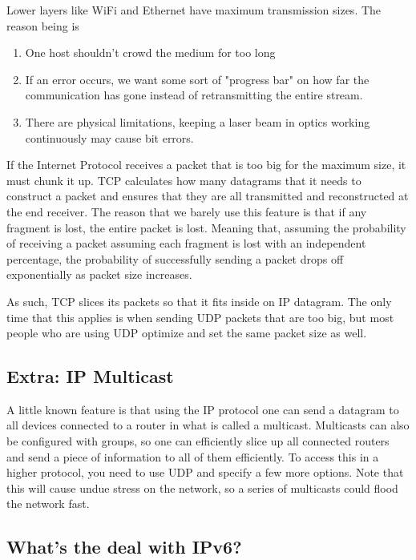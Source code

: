 Lower layers like WiFi and Ethernet have maximum transmission sizes.
The reason being is

\begin{enumerate}
  \item One host shouldn't crowd the medium for too long
  \item If an error occurs, we want some sort of "progress bar" on how far the communication has gone instead of retransmitting the entire stream.
  \item There are physical limitations, keeping a laser beam in optics working continuously may cause bit errors.
\end{enumerate}

If the Internet Protocol receives a packet that is too big for the maximum size, it must chunk it up.
TCP calculates how many datagrams that it needs to construct a packet and ensures that they are all transmitted and reconstructed at the end receiver.
The reason that we barely use this feature is that if any fragment is lost, the entire packet is lost.
Meaning that, assuming the probability of receiving a packet assuming each fragment is lost with an independent percentage, the probability of successfully sending a packet drops off exponentially as packet size increases.

As such, TCP slices its packets so that it fits inside on IP datagram.
The only time that this applies is when sending UDP packets that are too big, but most people who are using UDP optimize and set the same packet size as well.

\subsection{Extra: IP Multicast}

A little known feature is that using the IP protocol one can send a datagram to all devices connected to a router in what is called a multicast.
Multicasts can also be configured with groups, so one can efficiently slice up all connected routers and send a piece of information to all of them efficiently.
To access this in a higher protocol, you need to use UDP and specify a few more options.
Note that this will cause undue stress on the network, so a series of multicasts could flood the network fast.

\subsection{What's the deal with IPv6?}


